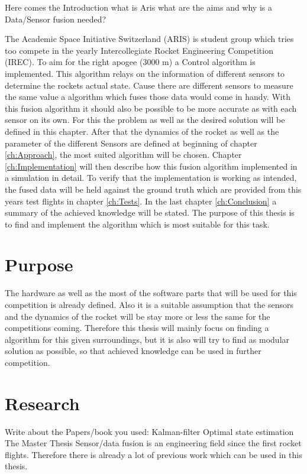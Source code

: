 

 Here comes the Introduction what is Aris what are the aims and why is a Data/Sensor fusion needed? 
 
 The Academic Space Initiative Switzerland (ARIS) is student group which tries too compete in the yearly Intercollegiate Rocket Engineering Competition (IREC).
 To aim for the right apogee (3000 m) a Control algorithm is implemented. This algorithm relays on the information of different sensors to determine the rockets actual state.
 Cause there are different sensors to measure the same value a algorithm which fuses those data would come in handy.
 With this fusion algorithm it should also be possible to be more accurate as with each sensor on its own.
 For this the problem as well as the desired solution will be defined in this chapter.
 After that the dynamics of the rocket as well as the parameter of the different Sensors are defined at beginning of chapter \ref{ch:Approach}, the most suited algorithm will be chosen.
 Chapter \ref{ch:Implementation} will then describe how this fusion algorithm implemented in a simulation in detail.
 To verify that the implementation is working as intended, the fused data will be held against the ground truth which are provided from this years test flights in chapter \ref{ch:Tests}.
 In the last chapter \ref{ch:Conclusion} a summary of the achieved knowledge will be stated.
 The purpose of this thesis is to find and implement the algorithm which is most suitable for this task.
 
 \section{Purpose}
 The hardware as well as the most of the software parts that will be used for this competition is already defined.
 Also it is a suitable assumption that the sensors and the dynamics of the rocket will be stay more or less the same for the competitions coming.
 Therefore this thesis will mainly focus on finding a algorithm for this given surroundings, but it is also will try to find as modular solution as possible, 
 so that achieved knowledge can be used in further competition.
  
 \section{Research}
 Write about the Papers/book you used:
 Kalman-filter
 Optimal state estimation
 The Master Thesis
 Sensor/data fusion is an engineering field since the first rocket flights. Therefore there is already a lot of previous work which can be used in this thesis.
 
